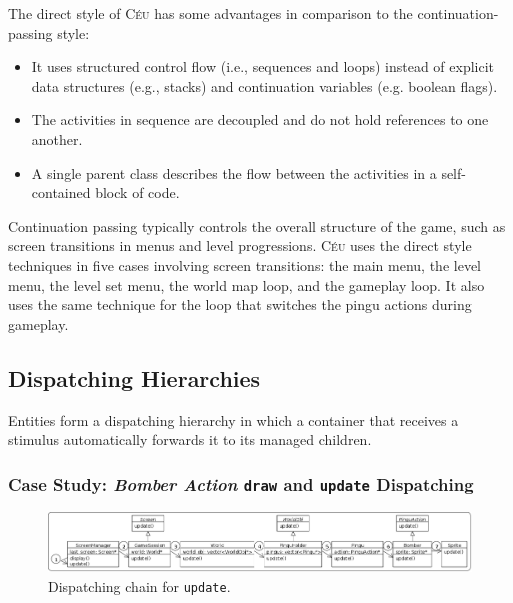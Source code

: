 \documentclass{vgtc}                          %
\newcommand{\CEU}{\textsc{C\'{e}u}\xspace}
\newcommand{\code}[1] {{\small{\texttt{#1}}}}
\newcommand{\Code}[1] {{\texttt{#1}}}
\begin{document}
The direct style of \CEU has some advantages in comparison to the 
continuation-passing style:
%
\begin{itemize}
\item It uses structured control flow (i.e., sequences and loops) instead of 
      explicit data structures (e.g., stacks) and continuation variables (e.g.
      boolean flags).
\item The activities in sequence are decoupled and do not hold references to
      one another. %
\item A single parent class describes the flow between the activities in a 
      self-contained block of code. %
\end{itemize}

Continuation passing typically controls the overall structure of the game,
such as screen transitions in menus and level progressions.
%
\CEU uses the direct style techniques in five cases involving screen
transitions:
the main menu, the level menu, the level set menu, the world map loop, and
the gameplay loop.
%
It also uses the same technique for the loop that switches the pingu actions
during gameplay.

\subsection{Dispatching Hierarchies}
\label{sec.pats.dispatching}

    Entities form a dispatching hierarchy in which a container that receives a
    stimulus automatically forwards it to its managed children.

\subsubsection{Case Study: \emph{Bomber Action} \Code{draw} and \Code{update} Dispatching}

\begin{figure}[t]
\centering
\includegraphics[width=\textwidth]{hierarchy}
\caption{Dispatching chain for \code{update}.
\label{fig.hier}
}
\end{figure}
\end{document}

